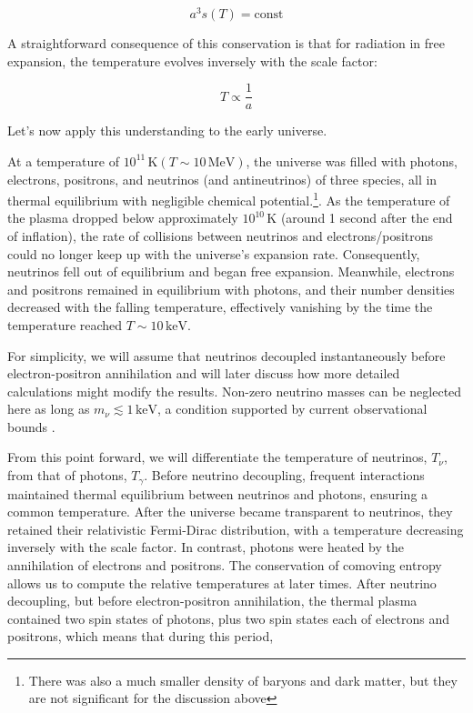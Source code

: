 \begin{equation}
    a^{3} s(T)=\text{const} \label{1.53}
\end{equation}

A straightforward consequence of this conservation is that for radiation in free expansion, the temperature evolves inversely with the scale factor:

\begin{equation}
    T \propto \frac{1}{a}\label{1.54}
\end{equation}

Let's now apply this understanding to the early universe.

At a temperature of $10^{11} \, \mathrm{K} (T \sim 10 \, \mathrm{MeV})$, the universe was filled with photons, electrons, positrons, and neutrinos (and antineutrinos) of three species, all in thermal equilibrium with negligible chemical potential.\footnote{There was also a much smaller density of baryons and dark matter, but they are not significant for the discussion above}. As the temperature of the plasma dropped below approximately $10^{10} \, \mathrm{K}$ (around 1 second after the end of inflation), the rate of collisions between neutrinos and electrons/positrons could no longer keep up with the universe's expansion rate. Consequently, neutrinos fell out of equilibrium and began free expansion. Meanwhile, electrons and positrons remained in equilibrium with photons, and their number densities decreased with the falling temperature, effectively vanishing by the time the temperature reached $T \sim 10 \, \mathrm{keV}$.

For simplicity, we will assume that neutrinos decoupled instantaneously before electron-positron annihilation and will later discuss how more detailed calculations might modify the results. Non-zero neutrino masses can be neglected here as long as $m_{\nu} \lesssim 1 \, \mathrm{keV}$, a condition supported by current observational bounds \cite{PLanck20182020}.

From this point forward, we will differentiate the temperature of neutrinos, $T_{\nu}$, from that of photons, $T_{\gamma}$. Before neutrino decoupling, frequent interactions maintained thermal equilibrium between neutrinos and photons, ensuring a common temperature. After the universe became transparent to neutrinos, they retained their relativistic Fermi-Dirac distribution, with a temperature decreasing inversely with the scale factor. In contrast, photons were heated by the annihilation of electrons and positrons.
The conservation of comoving entropy allows us to compute the relative temperatures at later times.
After neutrino decoupling, but before electron-positron annihilation, the thermal plasma contained two spin states of photons, plus two spin states each of electrons and positrons, which means that during this period,

